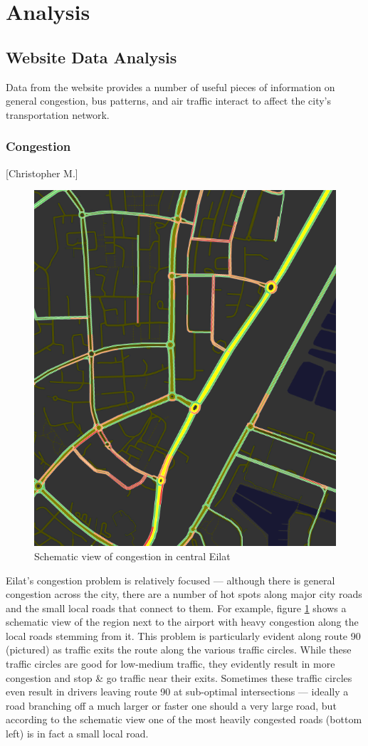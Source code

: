 \documentclass[12pt]{article}                               %
\begin{document}
\newpage
\section{Analysis}\label{sec:analysis}

\subsection{Website Data Analysis}
Data from the website provides a number of useful pieces of information on general congestion, bus patterns, and air traffic interact to affect the city's transportation network.

\subsubsection{Congestion}[Christopher M.]
\begin{figure}[H]
    \centering
    \includegraphics[width=0.5\columnwidth]{images/congestion.png}
    \caption{Schematic view of congestion in central Eilat}
    \label{img:eilat_congestion}
\end{figure}

Eilat's congestion problem is relatively focused --- although there is general congestion across the city, there are a number of hot spots along major city roads and the small local roads that connect to them. For example, figure \ref{img:eilat_congestion} shows a schematic view of the region next to the airport with heavy congestion along the local roads stemming from it. This problem is particularly evident along route 90 (pictured) as traffic exits the route along the various traffic circles. While these traffic circles are good for low-medium traffic, they evidently result in more congestion and stop \& go traffic near their exits. Sometimes these traffic circles even result in drivers leaving route 90 at sub-optimal intersections --- ideally a road branching off a much larger or faster one should a very large road, but according to the schematic view one of the most heavily congested roads (bottom left) is in fact a small local road.
\end{document}
